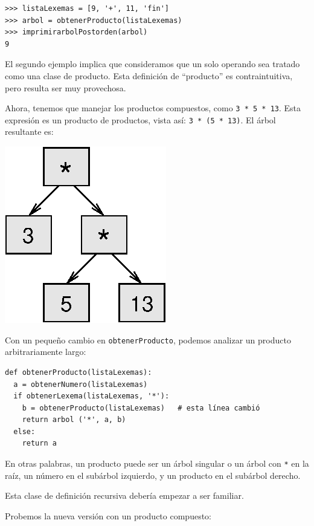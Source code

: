 \beforeverb
\begin{verbatim}
>>> listaLexemas = [9, '+', 11, 'fin']
>>> arbol = obtenerProducto(listaLexemas)
>>> imprimirarbolPostorden(arbol)
9
\end{verbatim}
\afterverb
%
El segundo ejemplo implica que consideramos que un solo
operando sea tratado como una clase de producto. Esta 
definición de ``producto'' es contraintuitiva, pero resulta
ser muy provechosa.

Ahora, tenemos que manejar los productos compuestos, como 
 \texttt{3 * 5 * 13}. Esta expresión es un  producto de productos, 
vista así: \texttt{3 * (5 * 13)}. El árbol resultante es:

\beforefig
\centerline{\includegraphics{illustrations/tree4.eps}}
\afterfig

Con un pequeño cambio en \texttt{obtenerProducto}, podemos 
analizar un producto arbitrariamente largo:

\beforeverb
\begin{verbatim}
def obtenerProducto(listaLexemas):
  a = obtenerNumero(listaLexemas)
  if obtenerLexema(listaLexemas, '*'):
    b = obtenerProducto(listaLexemas)   # esta línea cambió
    return arbol ('*', a, b)
  else:
    return a
\end{verbatim}
\afterverb
%
En otras palabras, un producto puede ser un árbol singular o un 
 árbol con \texttt{*} en la raíz, un número en el subárbol izquierdo, 
y un producto en el subárbol derecho.

Esta clase de definición recursiva debería empezar a ser familiar.


Probemos la nueva versión con un producto compuesto:

